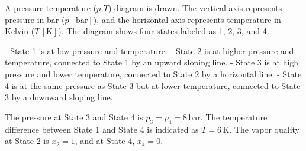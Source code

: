 A pressure-temperature (\( p \)-\( T \)) diagram is drawn. The vertical axis represents pressure in bar (\( p \, [\text{bar}] \)), and the horizontal axis represents temperature in Kelvin (\( T \, [\text{K}] \)). The diagram shows four states labeled as 1, 2, 3, and 4.  

- State 1 is at low pressure and temperature.  
- State 2 is at higher pressure and temperature, connected to State 1 by an upward sloping line.  
- State 3 is at high pressure and lower temperature, connected to State 2 by a horizontal line.  
- State 4 is at the same pressure as State 3 but at lower temperature, connected to State 3 by a downward sloping line.  

The pressure at State 3 and State 4 is \( p_3 = p_4 = 8 \, \text{bar} \).  
The temperature difference between State 1 and State 4 is indicated as \( T = 6 \, \text{K} \).  
The vapor quality at State 2 is \( x_2 = 1 \), and at State 4, \( x_4 = 0 \).